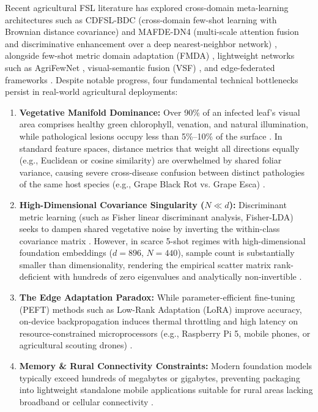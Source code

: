 \documentclass[preprint,12pt]{elsarticle}
\begin{document}
Recent agricultural FSL literature has explored cross-domain meta-learning architectures such as CDFSL-BDC (cross-domain few-shot learning with Brownian distance covariance) \cite{yang2024laboratory} and MAFDE-DN4 (multi-scale attention fusion and discriminative enhancement over a deep nearest-neighbor network) \cite{zhao2024mafde}, alongside few-shot metric domain adaptation (FMDA) \cite{kudo2025few}, lightweight networks such as AgriFewNet \cite{babu2025agrifewnet}, visual-semantic fusion (VSF) \cite{zhou2026vsf}, and edge-federated frameworks \cite{sharif2026real}. Despite notable progress, four fundamental technical bottlenecks persist in real-world agricultural deployments:
\begin{enumerate}
    \item \textbf{Vegetative Manifold Dominance:} Over 90\% of an infected leaf's visual area comprises healthy green chlorophyll, venation, and natural illumination, while pathological lesions occupy less than 5\%--10\% of the surface \cite{shoaib2023advanced}. In standard feature spaces, distance metrics that weight all directions equally (e.g., Euclidean or cosine similarity) are overwhelmed by shared foliar variance, causing severe cross-disease confusion between distinct pathologies of the same host species (e.g., Grape Black Rot vs. Grape Esca) \cite{zhou2026vsf}.
    \item \textbf{High-Dimensional Covariance Singularity ($N \ll d$):} Discriminant metric learning (such as Fisher linear discriminant analysis, Fisher-LDA) seeks to dampen shared vegetative noise by inverting the within-class covariance matrix \cite{fisher1936use}. However, in scarce 5-shot regimes with high-dimensional foundation embeddings ($d=896$, $N=440$), sample count is substantially smaller than dimensionality, rendering the empirical scatter matrix rank-deficient with hundreds of zero eigenvalues and analytically non-invertible \cite{ledoit2004well}.
    \item \textbf{The Edge Adaptation Paradox:} While parameter-efficient fine-tuning (PEFT) methods such as Low-Rank Adaptation (LoRA) \cite{hu2022lora} improve accuracy, on-device backpropagation induces thermal throttling and high latency on resource-constrained microprocessors (e.g., Raspberry Pi 5, mobile phones, or agricultural scouting drones) \cite{zhao2026lightweight}.
    \item \textbf{Memory \& Rural Connectivity Constraints:} Modern foundation models typically exceed hundreds of megabytes or gigabytes, preventing packaging into lightweight standalone mobile applications suitable for rural areas lacking broadband or cellular connectivity \cite{zhao2026lightweight, sharif2026real}.
\end{enumerate}
\end{document}

